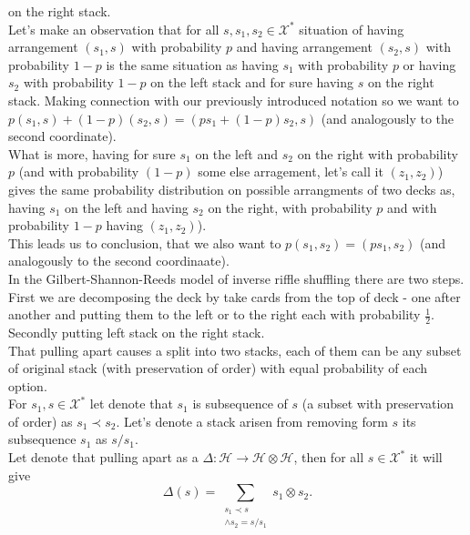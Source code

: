 \documentclass[a4paper, 12pt]{report}
\begin{document}
on the right stack. \\
Let's make an observation that for all $s, s_1, s_2 \in \mathcal{X}^*$ situation of having arrangement
$(s_1, s)$ with probability $p$ and having arrangement $(s_2, s)$ with probability $1-p$ is
the same situation as having $s_1$ with probability $p$ or having $s_2$ with probability $1 - p$ on the left
stack and for sure having $s$ on the right stack. Making connection with our previously introduced notation
so we want to $p(s_1, s) + (1-p)(s_2, s) = (ps_1 + (1-p)s_2, s)$ (and analogously to the second
coordinate).\\
What is more, having for sure $s_1$ on the left and $s_2$ on the right with probability $p$ (and
with probability $(1 - p)$ some else arragement, let's call it $(z_1, z_2)$) gives the same probability
distribution
on possible arrangments of two decks as, having $s_1$ on the left and having $s_2$ on the
right, with probability $p$ and with probability $1-p$ having $(z_1,z_2)$).\\
This leads us to conclusion, that we also want to $p(s_1,s_2) = (ps_1, s_2)$ (and analogously to the second
coordinaate). \\
In the Gilbert-Shannon-Reeds model of inverse riffle shuffling there are two steps. First we are
decomposing the deck by take cards from the top of deck - one after another and putting them to the left
or to the right each with probability $\frac{1}{2}$. Secondly putting left stack on the right stack. \\
That pulling apart causes a split into two stacks, each of them can be any subset of original stack
(with preservation of order) with equal probability of each option. \\
For $s_1, s \in \mathcal{X}^*$ let denote that $s_1$ is subsequence of $s$ (a subset with preservation of
order) as $s_1 \prec s_2$. Let's denote a stack arisen from removing form $s$ its subsequence $s_1$ as
$s/s_1$. \\
Let denote that pulling apart as a $\Delta : \mathcal{H} \to \mathcal{H} \otimes \mathcal{H}$, then for all
$s \in \mathcal{X}^*$ it will give
\begin{equation*}
\Delta(s) = \sum_{\substack{s_1 \prec s \\ \land s_2 = s/s_1}}
s_1 \otimes s_2.
\end{equation*}
\end{document}
